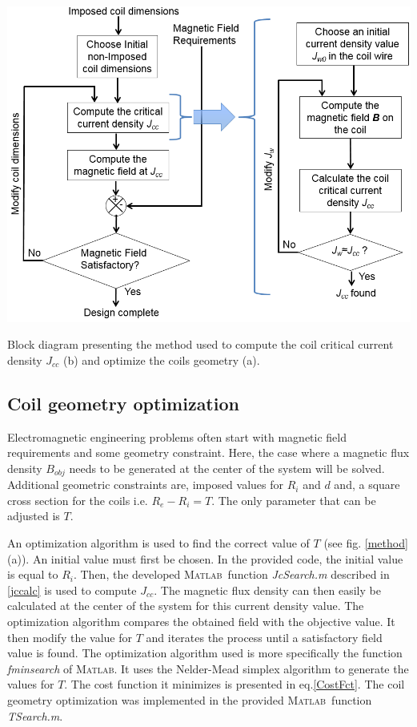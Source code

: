 \documentclass{ws-jmrr}
\newcommand{\MATLAB}{\textsc{Matlab}}
\begin{document}
\begin{multicols}{2}
\begin{figurehere}
\begin{center}
	\includegraphics[width=\linewidth]{method.png}
	\caption{Block diagram presenting the method used to compute the coil critical current density $J_{cc}$ (b) and optimize the coils geometry (a).}
	\label{method}
	\end{center}
\end{figurehere}
\subsection{Coil geometry optimization}

Electromagnetic engineering problems often start with magnetic field requirements and some geometry constraint. Here, the case where a magnetic flux density $B_{obj}$ needs to be generated at the center of the system will be solved. Additional geometric constraints are, imposed values for $R_i$ and $d$ and, a square cross section for the coils i.e. $R_e-R_i=T$. The only parameter that can be adjusted is $T$.\par
An optimization algorithm is used to find the correct value of $T$ (see fig. \ref{method} (a)). An initial value must first be chosen. In the provided code, the initial value is equal to $R_i$. Then, the developed \MATLAB ~function \emph{JcSearch.m} described in \ref{jccalc} is used to compute $J_{cc}$. The magnetic flux density can then easily be calculated at the center of the system for this current density value. The optimization algorithm compares the obtained field with the objective value. It then modify the value for $T$ and iterates the process until a satisfactory field value is found. The optimization algorithm used is more specifically the function \emph{fminsearch} of \MATLAB. It uses the Nelder-Mead simplex algorithm \cite{lagarias1998convergence} to generate the values for $T$. The cost function it minimizes is presented in eq.\ref{CostFct}. The coil geometry optimization was implemented in the provided \MATLAB ~function \emph{TSearch.m}.


\end{multicols}
\end{document}
